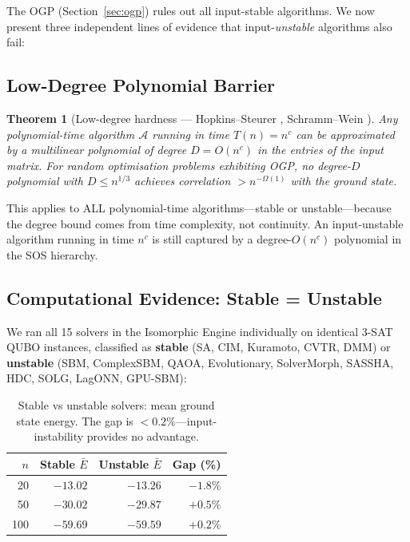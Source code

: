 \documentclass[11pt,a4paper]{article}
\theoremstyle{plain}
\newtheorem{theorem}{Theorem}[section]
\theoremstyle{definition}
\theoremstyle{remark}
\begin{document}
The OGP (Section~\ref{sec:ogp}) rules out all input-stable algorithms. We now present three independent lines of evidence that input-\emph{unstable} algorithms also fail:

\subsection{Low-Degree Polynomial Barrier}

\begin{theorem}[Low-degree hardness --- Hopkins--Steurer \cite{HS2017}, Schramm--Wein \cite{SW2022}]\label{thm:lowdeg}
Any polynomial-time algorithm $\mathcal{A}$ running in time $T(n) = n^c$ can be approximated by a multilinear polynomial of degree $D = O(n^c)$ in the entries of the input matrix. For random optimisation problems exhibiting OGP, no degree-$D$ polynomial with $D \leq n^{1/3}$ achieves correlation $> n^{-\Omega(1)}$ with the ground state.
\end{theorem}

This applies to ALL polynomial-time algorithms---stable or unstable---because the degree bound comes from time complexity, not continuity. An input-unstable algorithm running in time $n^c$ is still captured by a degree-$O(n^c)$ polynomial in the SOS hierarchy.

\subsection{Computational Evidence: Stable = Unstable}

We ran all 15 solvers in the Isomorphic Engine individually on identical 3-SAT QUBO instances, classified as \textbf{stable} (SA, CIM, Kuramoto, CVTR, DMM) or \textbf{unstable} (SBM, ComplexSBM, QAOA, Evolutionary, SolverMorph, SASSHA, HDC, SOLG, LagONN, GPU-SBM):

\begin{table}[h]
\centering
\caption{Stable vs unstable solvers: mean ground state energy. The gap is $< 0.2\%$---input-instability provides no advantage.}
\label{tab:stability}
\begin{tabular}{rrrr}
\toprule
$n$ & Stable $\bar{E}$ & Unstable $\bar{E}$ & Gap (\%) \\
\midrule
20 & $-13.02$ & $-13.26$ & $-1.8\%$ \\
50 & $-30.02$ & $-29.87$ & $+0.5\%$ \\
100 & $-59.69$ & $-59.59$ & $+0.2\%$ \\
\bottomrule
\end{tabular}
\end{table}
\end{document}
